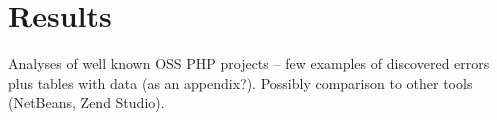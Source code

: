 \chapter{Results}
Analyses of well known OSS PHP projects -- few examples of discovered 
errors plus tables with data (as an appendix?). Possibly comparison 
to other tools (NetBeans, Zend Studio).

